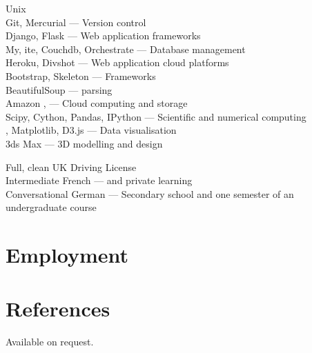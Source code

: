 \documentclass[10pt]{article}
\begin{document}
        {
            Unix\\
            Git, Mercurial --- Version control\\
            Django, Flask --- Web application frameworks\\
            My, ite, Couchdb, Orchestrate --- Database management\\
            Heroku, Divshot --- Web application cloud platforms\\
            Bootstrap, Skeleton ---  Frameworks\\
            BeautifulSoup ---  parsing\\
            Amazon ,  --- Cloud computing and storage\\
            Scipy, Cython, Pandas, IPython --- Scientific and numerical computing\\
            , Matplotlib, D3.js --- Data visualisation\\
            3ds Max --- 3D modelling and design
        }


        {
            Full, clean UK Driving License\\
            Intermediate French ---   and private learning\\
            Conversational German --- Secondary school and one semester of an undergraduate course\\
        }

    \section{Employment}




    \section{References}

        Available on request.
\end{document}

